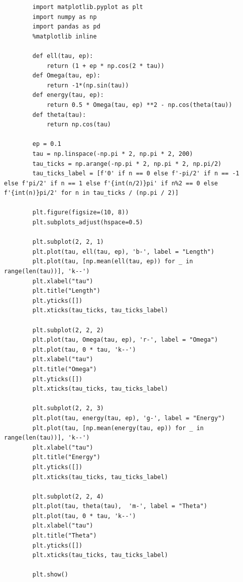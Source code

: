 \documentclass[12pt]{article}
\begin{document}
\begin{enumerate}[]
\begin{lstlisting}
        import matplotlib.pyplot as plt
        import numpy as np
        import pandas as pd
        %matplotlib inline

        def ell(tau, ep):
            return (1 + ep * np.cos(2 * tau))
        def Omega(tau, ep):
            return -1*(np.sin(tau))
        def energy(tau, ep):
            return 0.5 * Omega(tau, ep) **2 - np.cos(theta(tau))
        def theta(tau):
            return np.cos(tau)

        ep = 0.1
        tau = np.linspace(-np.pi * 2, np.pi * 2, 200)
        tau_ticks = np.arange(-np.pi * 2, np.pi * 2, np.pi/2)
        tau_ticks_label = [f'0' if n == 0 else f'-pi/2' if n == -1 else f'pi/2' if n == 1 else f'{int(n/2)}pi' if n%2 == 0 else f'{int(n)}pi/2' for n in tau_ticks / (np.pi / 2)] 
        
        plt.figure(figsize=(10, 8))
        plt.subplots_adjust(hspace=0.5)
        
        plt.subplot(2, 2, 1)
        plt.plot(tau, ell(tau, ep), 'b-', label = "Length")
        plt.plot(tau, [np.mean(ell(tau, ep)) for _ in range(len(tau))], 'k--')
        plt.xlabel("tau")
        plt.title("Length")
        plt.yticks([])  
        plt.xticks(tau_ticks, tau_ticks_label)
        
        plt.subplot(2, 2, 2)
        plt.plot(tau, Omega(tau, ep), 'r-', label = "Omega")
        plt.plot(tau, 0 * tau, 'k--')
        plt.xlabel("tau")
        plt.title("Omega")
        plt.yticks([])  
        plt.xticks(tau_ticks, tau_ticks_label)
        
        plt.subplot(2, 2, 3)
        plt.plot(tau, energy(tau, ep), 'g-', label = "Energy")
        plt.plot(tau, [np.mean(energy(tau, ep)) for _ in range(len(tau))], 'k--')
        plt.xlabel("tau")
        plt.title("Energy")
        plt.yticks([])  
        plt.xticks(tau_ticks, tau_ticks_label)
        
        plt.subplot(2, 2, 4)
        plt.plot(tau, theta(tau),  'm-', label = "Theta")
        plt.plot(tau, 0 * tau, 'k--')
        plt.xlabel("tau")
        plt.title("Theta")
        plt.yticks([])  
        plt.xticks(tau_ticks, tau_ticks_label)
        
        plt.show()

        \end{lstlisting}
        

\end{enumerate}
\end{document}

